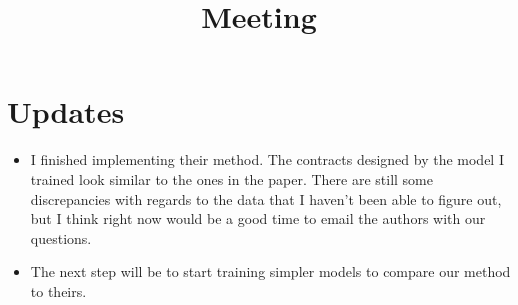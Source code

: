 \documentclass[11pt]{article}
\title{Meeting}
\begin{document}
\maketitle
\section{Updates}
  \begin{itemize}
    \item I finished implementing their method. The contracts designed by the model I trained look similar to the ones in the paper. There are still some discrepancies with regards to the data that I haven't been able to figure out, but I think right now would be a good time to email the authors with our questions. 
    \item The next step will be to start training simpler models to compare our method to theirs. 
  \end{itemize}
\end{document}
